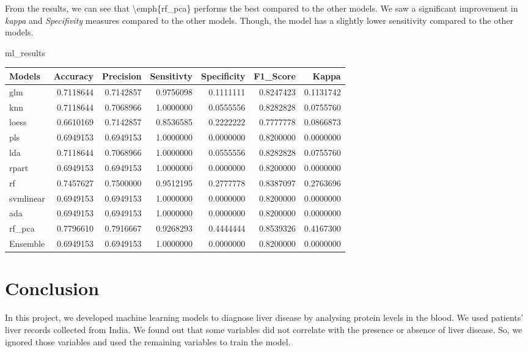 \documentclass[]{article}
\newenvironment{Shaded}{\begin{snugshade}}{\end{snugshade}}
\newcommand{\NormalTok}[1]{#1}
\begin{document}
From the results, we can see that \textbackslash emph\{rf\_pca\}
performs the best compared to the other models. We saw a significant
improvement in \emph{kappa} and \emph{Specifivity} measures compared to
the other models. Though, the model has a slightly lower sensitivity
compared to the other models.

\begin{Shaded}
\begin{Highlighting}[]
\NormalTok{ml_results}
\end{Highlighting}
\end{Shaded}

\begin{longtable}[]{@{}lrrrrrr@{}}
\toprule
Models & Accuracy & Precision & Sensitivty & Specificity & F1\_Score &
Kappa\tabularnewline
\midrule
\endhead
glm & 0.7118644 & 0.7142857 & 0.9756098 & 0.1111111 & 0.8247423 &
0.1131742\tabularnewline
knn & 0.7118644 & 0.7068966 & 1.0000000 & 0.0555556 & 0.8282828 &
0.0755760\tabularnewline
loess & 0.6610169 & 0.7142857 & 0.8536585 & 0.2222222 & 0.7777778 &
0.0866873\tabularnewline
pls & 0.6949153 & 0.6949153 & 1.0000000 & 0.0000000 & 0.8200000 &
0.0000000\tabularnewline
lda & 0.7118644 & 0.7068966 & 1.0000000 & 0.0555556 & 0.8282828 &
0.0755760\tabularnewline
rpart & 0.6949153 & 0.6949153 & 1.0000000 & 0.0000000 & 0.8200000 &
0.0000000\tabularnewline
rf & 0.7457627 & 0.7500000 & 0.9512195 & 0.2777778 & 0.8387097 &
0.2763696\tabularnewline
svmlinear & 0.6949153 & 0.6949153 & 1.0000000 & 0.0000000 & 0.8200000 &
0.0000000\tabularnewline
ada & 0.6949153 & 0.6949153 & 1.0000000 & 0.0000000 & 0.8200000 &
0.0000000\tabularnewline
rf\_pca & 0.7796610 & 0.7916667 & 0.9268293 & 0.4444444 & 0.8539326 &
0.4167300\tabularnewline
Ensemble & 0.6949153 & 0.6949153 & 1.0000000 & 0.0000000 & 0.8200000 &
0.0000000\tabularnewline
\bottomrule
\end{longtable}

\section{Conclusion}
\label{sec:conclusion}

In this project, we developed machine learning models to diagnose liver
disease by analysing protein levels in the blood. We used patients'
liver records collected from India. We found out that some variables did
not correlate with the presence or absence of liver disease. So, we
ignored those variables and used the remaining variables to train the
model.
\end{document}
